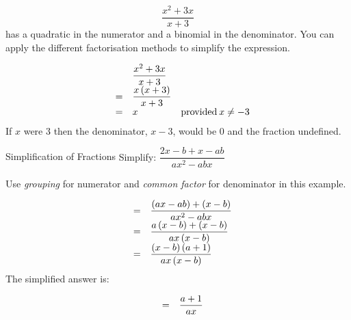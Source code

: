     \begin{equation}
    \dfrac{{x}^{2}+3x}{x+3}
      \end{equation}
      \label{m39392*id279276}has a quadratic in the numerator and a binomial in the denominator. You can apply the different factorisation methods to simplify the expression.\par 
      \label{m39392*id279282}\nopagebreak\noindent{}
    \begin{equation}
    \begin{array}{cccc}& \phantom{\rule{4pt}{0ex}}& \dfrac{{x}^{2}+3x}{x+3}\hfill & \\ & =& \dfrac{x\left(x+3\right)}{x+3}\hfill & \\ & =& x\hfill & \mathrm{provided}\phantom{\rule{2pt}{0ex}}x\ne -3\hfill \end{array}
      \end{equation}
      \label{m39392*id279389}If $x$ were 3 then the denominator, $x-3$, would be 0 and the fraction undefined.\par 
  
      \begin{wex}{ Simplification of Fractions }{Simplify: $\dfrac{2x-b+x-ab}{a{x}^{2}-abx}$}{
       

\westep{}Use \textsl{grouping} for numerator and \textsl{common factor} for denominator in this example.\par 

        
    \begin{equation}
    \begin{array}{ccc}& =& \dfrac{\left(ax-ab\right)+\left(x-b\right)}{a{x}^{2}-abx}\hfill \\ & =& \dfrac{a\left(x-b\right)+\left(x-b\right)}{ax\left(x-b\right)}\hfill \\ & =& \dfrac{\left(x-b\right)\left(a+1\right)}{ax\left(x-b\right)}\hfill \end{array}
      \end{equation}
    \westep{}  
      \label{m39392*id279695}The simplified answer is:\par 
      \label{m39392*id279699}\nopagebreak\noindent{}
        
    \begin{equation}
    \begin{array}{ccc}& =& \dfrac{a+1}{ax}\hfill \end{array}
      \end{equation}
  }
    \end{wex}


